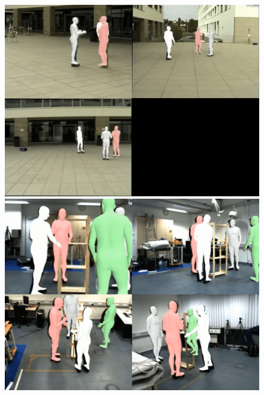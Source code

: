 \documentclass{egpubl}
\begin{document}
\label{sec:results} 

\begin{figure}[htb]
    \centering
    \begin{minipage}[b]{0.32\textwidth}
        \centering
        \includegraphics[width=\linewidth]{figures/campus2.png}
    \end{minipage}%
    \hspace{0.01\textwidth}
    \begin{minipage}[b]{0.32\textwidth}
        \centering
        \includegraphics[width=\linewidth]{figures/shelf.png}
    \end{minipage}%
    \hspace{0.01\textwidth}
    \begin{minipage}[b]{0.32\textwidth}

\end{minipage}
\end{figure}
\end{document}
